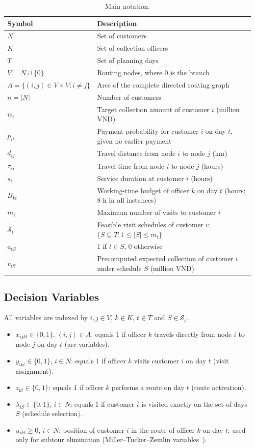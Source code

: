 \documentclass[11pt,a4paper]{article}
\begin{document}
\begin{table}[htbp]
\centering
\caption{Main notation.}
\label{tab:notation}
\small
\begin{tabularx}{\linewidth}{@{}lX@{}}
\toprule
Symbol & Description \\
\midrule
$N$ & Set of customers \\
$K$ & Set of collection officers \\
$T$ & Set of planning days \\
$V=N\cup\{0\}$ & Routing nodes, where $0$ is the branch \\
$A=\{(i,j)\in V\times V: i\ne j\}$ & Arcs of the complete directed routing graph \\
$n=|N|$ & Number of customers \\
$w_i$ & Target collection amount of customer $i$ (million VND) \\
$p_{it}$ & Payment probability for customer $i$ on day $t$, given no earlier payment \\
$d_{ij}$ & Travel distance from node $i$ to node $j$ (km) \\
$\tau_{ij}$ & Travel time from node $i$ to node $j$ (hours) \\
$s_i$ & Service duration at customer $i$ (hours) \\
$B_{kt}$ & Working-time budget of officer $k$ on day $t$ (hours; 8 h in all instances) \\
$m_i$ & Maximum number of visits to customer $i$ \\
$\mathcal S_i$ & Feasible visit schedules of customer $i$: $\{S\subseteq T: 1\le|S|\le m_i\}$ \\
$a_{tS}$ & $1$ if $t\in S$, $0$ otherwise \\
$v_{iS}$ & Precomputed expected collection of customer $i$ under schedule $S$ (million VND) \\
\bottomrule
\end{tabularx}
\end{table}

\subsection{Decision Variables}
All variables are indexed by $i,j\in V$, $k\in K$, $t\in T$ and
$S\in\mathcal S_i$.
\begin{itemize}
\item $x_{ijkt}\in\{0,1\}$, $(i,j)\in A$: equals 1 if officer $k$ travels
  directly from node $i$ to node $j$ on day $t$ (arc variables).
\item $y_{ikt}\in\{0,1\}$, $i\in N$: equals 1 if officer $k$ visits customer
  $i$ on day $t$ (visit assignment).
\item $z_{kt}\in\{0,1\}$: equals 1 if officer $k$ performs a route on day
  $t$ (route activation).
\item $\lambda_{iS}\in\{0,1\}$, $i\in N$: equals 1 if customer $i$ is
  visited exactly on the set of days $S$ (schedule selection).
\item $u_{ikt}\ge 0$, $i\in N$: position of customer $i$ in the route of
  officer $k$ on day $t$; used only for subtour elimination
  (Miller--Tucker--Zemlin variables~\cite{mtz1960}).
\end{itemize}
\end{document}
